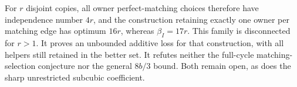 For $r$ disjoint copies, all owner perfect-matching choices therefore have
independence number $4r$, and the construction retaining exactly one owner
per matching edge has optimum $16r$, whereas $\beta_I=17r$.
This family is disconnected for $r>1$. It proves an unbounded additive loss
for that construction, with all helpers still retained in the better set.
It refutes neither the full-cycle matching-selection conjecture nor the
general $8b/3$ bound. Both remain open, as does the sharp unrestricted
subcubic coefficient.
